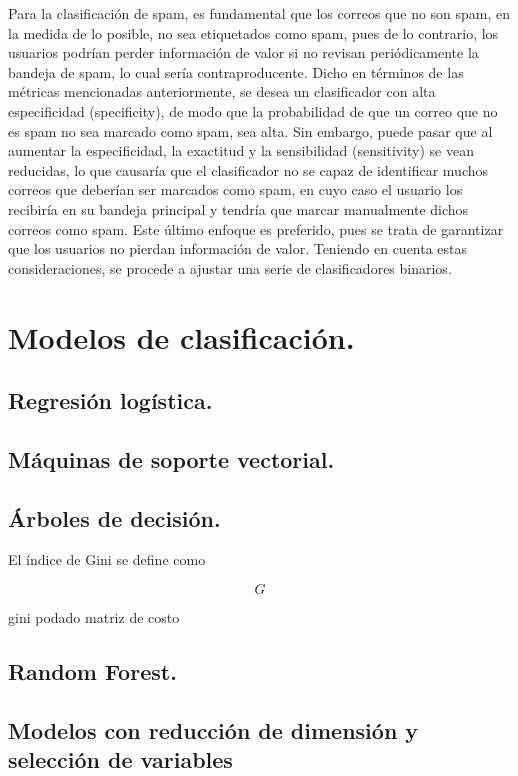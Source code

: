 \documentclass[12pt, letterpaper]{article}
\begin{document}
Para la clasificación de spam, es fundamental que los correos que no son spam, en la medida de lo posible, no sea etiquetados como spam, pues de lo contrario, los usuarios podrían perder información de valor si no revisan periódicamente la bandeja de spam, lo cual sería contraproducente. Dicho en términos de las métricas mencionadas anteriormente, se desea un clasificador con alta especificidad (specificity), de modo que la probabilidad de que un correo que no es spam no sea marcado como spam, sea alta. Sin embargo, puede pasar que al aumentar la especificidad, la exactitud y la sensibilidad (sensitivity) se vean reducidas, lo que causaría que el clasificador no se capaz de identificar muchos correos que deberían ser marcados como spam, en cuyo caso el usuario los recibiría en su bandeja principal y tendría que marcar manualmente dichos correos como spam. Este último enfoque es preferido, pues se trata de garantizar que los usuarios no pierdan información de valor. Teniendo en cuenta estas consideraciones, se procede a ajustar una serie de clasificadores binarios.


\section{Modelos de clasificación.}

\subsection{Regresión logística.}

\subsection{Máquinas de soporte vectorial.}

\subsection{Árboles de decisión.}

El índice de Gini se define como 

$$ G $$ 

gini
podado
matriz de costo

\subsection{Random Forest.}

\subsection{Modelos con reducción de dimensión y selección de variables}
\end{document}
